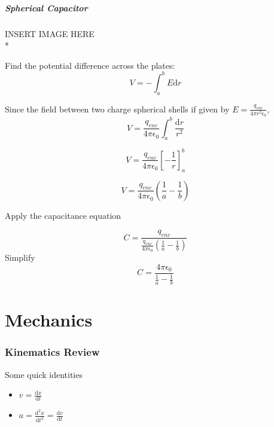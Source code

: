 \documentclass[a4paper,12pt]{article}
\begin{document}
			\subsubsection{Spherical Capacitor}
				INSERT IMAGE HERE\\*
				
				Find the potential difference across the plates:
				\begin{equation*}
						V = -\int_{a}^{b} E\mathrm{d}r
				\end{equation*}

				Since the field between two charge spherical shells if given by $E = \frac{q_{enc}}{4 \pi r^{2}\epsilon_{0}}$, 
				\begin{equation*}
						V = \frac{q_{enc}}{4 \pi \epsilon_{0}} \int_{a}^{b} \frac{\mathrm{d}r}{r^{2}}
				\end{equation*}

				\begin{equation*}
						V = \frac{q_{enc}}{4 \pi \epsilon_{0}} \left[ -\frac{1}{r} \right]_{a}^{b}
				\end{equation*}

				\begin{equation*}
						V =  \frac{q_{enc}}{4 \pi \epsilon_{0}} \left(\frac{1}{a} - \frac{1}{b}\right) 
				\end{equation*}

				Apply the capacitance equation

				\begin{equation*}
						C = \frac{q_{enc}}{\frac{q_{enc}}{4 \pi \epsilon_{0}} \left(\frac{1}{a} - \frac{1}{b}\right)} 
				\end{equation*}
				Simplify
				\begin{equation*}
						C = \frac{4\pi \epsilon_{0}}{\frac{1}{a} - \frac{1}{b}}	
				\end{equation*}

\newpage
\part{Mechanics}
		\section{Kinematics Review}
		Some quick identities
		\begin{itemize}
				\item $v = \frac{\mathrm{d}x}{\mathrm{d}t}$
				\item $a = \frac{\mathrm{d}^{2}x}{\mathrm{d}t^{2}} = \frac{\mathrm{d}v}{\mathrm{d}t}$
		\end{itemize}
\end{document}
